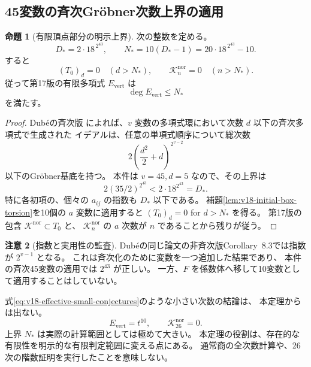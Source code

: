 \documentclass[a4paper,11pt]{ltjsarticle}
\theoremstyle{definition}
\newtheorem{theorem}{命題}[section]
\newtheorem{remark}[theorem]{注意}
\begin{document}
\subsection{45変数の斉次Gr\"obner次数上界の適用}

\begin{theorem}[有限頂点部分の明示上界]
\label{thm:v18-effective-vertex-cutoff}
次の整数を定める。
\begin{equation}\label{eq:v18-effective-cutoff-definition}
 D_*=2\cdot18^{\,2^{43}},\qquad
 N_*=10(D_*-1)=20\cdot18^{\,2^{43}}-10.
\end{equation}
すると
\[
 (T_0)_d=0\quad(d>N_*),\qquad
 \mathcal K_n^{\mathrm{nor}}=0\quad(n>N_*).
\]
従って第17版の有限多項式 $E_{\mathrm{vert}}$ は
\begin{equation}\label{eq:v18-Evert-explicit-degree}
 \deg E_{\mathrm{vert}}\le N_*
\end{equation}
を満たす。
\end{theorem}

\begin{proof}
Dub\'eの斉次版\cite[Theorem~8.2, p.~773]{Dube1990}
によれば、$v$ 変数の多項式環において次数 $d$ 以下の斉次多項式で生成された
イデアルは、任意の単項式順序について総次数
\[
 2\left(\frac{d^2}{2}+d\right)^{2^{v-2}}
\]
以下のGr\"obner基底を持つ。
本件は $v=45,d=5$ なので、その上界は
\[
 2(35/2)^{2^{43}}<2\cdot18^{2^{43}}=D_*.
\]
特に各初項の、個々の $a_{ij}$ の指数も $D_*$ 以下である。
補題\ref{lem:v18-initial-box-torsion}を10個の $a$ 変数に適用すると
$(T_0)_d=0$ for $d>N_*$ を得る。
第17版の包含 $\mathcal K^{\mathrm{nor}}\subset T_0$ と、
$\mathcal K_n^{\mathrm{nor}}$ の $a$ 次数が $n$ であることから残りが従う。
\end{proof}

\begin{remark}[指数と実用性の監査]
Dub\'eの同じ論文の非斉次版Corollary~8.3では指数が $2^{v-1}$ となる。
これは斉次化のために変数を一つ追加した結果であり、
本件の斉次45変数の適用では $2^{43}$ が正しい。
一方、$F$ を係数体へ移して10変数として適用することはしていない。

式\eqref{eq:v18-effective-small-conjectures}のような小さい次数の結論は、
本定理からは出ない。
\begin{equation}\label{eq:v18-effective-small-conjectures}
 E_{\mathrm{vert}}=t^{10},\qquad
 \mathcal K_{26}^{\mathrm{nor}}=0.
\end{equation}
上界 $N_*$ は実際の計算範囲としては極めて大きい。
本定理の役割は、存在的な有限性を明示的な有限判定範囲に変える点にある。
通常商の全次数計算や、26次の階数証明を実行したことを意味しない。
\end{remark}
\end{document}
